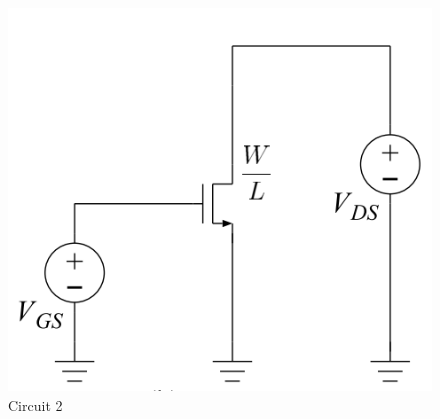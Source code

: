 \FloatBarrier

\begin{figure}[h!]
	\centering
	\includegraphics[scale=0.75]{../images/circuit_2.PNG}
	\caption{Circuit 2}
	\label{fig:circuit_2}
\end{figure}

\FloatBarrier
